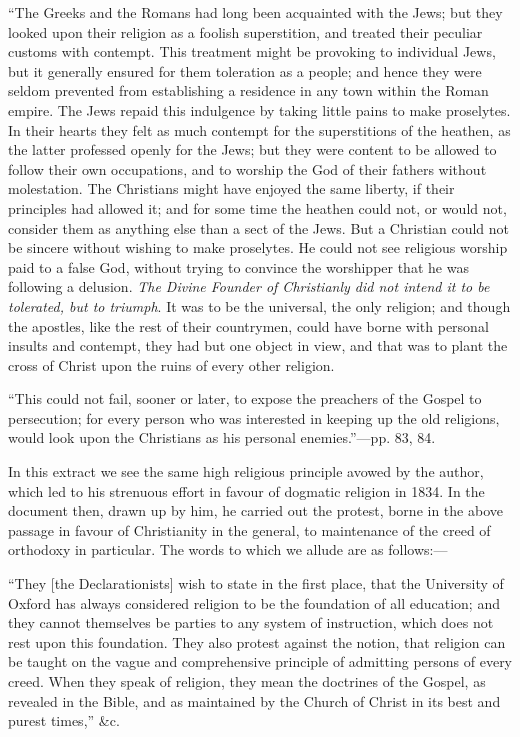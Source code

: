 ``The
Greeks and the Romans had long been acquainted with the Jews; but they
looked upon their religion as a foolish superstition, and treated their
peculiar customs with contempt. This treatment might be provoking to
individual Jews, but it generally ensured for them toleration as a
people; and hence they were seldom prevented from establishing a
residence in any town within the Roman empire. The Jews repaid this
indulgence by taking little pains to make proselytes. In their hearts
they felt as much contempt for the superstitions of the heathen, as the
latter professed openly for the Jews; but they were content to be
allowed to follow their own occupations, and to worship the God of their
fathers without molestation. The Christians might have enjoyed the same
liberty, if their principles had allowed it; and for some time the
heathen could not, or would not, consider them as anything else than a
sect of the Jews. But a Christian could not be sincere without wishing
to make proselytes. He could not see religious worship paid to a false
God, without trying to convince the worshipper that he was following a
delusion. \emph{The Divine Founder of Christianly did not intend it to be
tolerated, but to triumph}. It was to be the universal, the only
religion; and though the apostles, like the rest of their countrymen,
could have borne with personal insults and contempt, they had but one
object in view, and that was to plant the cross of Christ upon the ruins
of every other religion.

``This
could not fail, sooner or later, to expose the preachers of the Gospel
to persecution; for every person who was interested in keeping up the
old religions, would look upon the Christians as his personal
enemies.''—pp. 83, 84.

In this
extract we see the same high religious principle avowed by the author,
which led to his strenuous effort in favour of dogmatic religion in
1834. In the document then, drawn up by him, he carried out the protest,
borne in the above passage in favour of Christianity in the general, to
maintenance of the creed of orthodoxy in particular. The words to
which we allude are as follows:—

``They [the Declarationists] wish to
state in the first place, that the University of Oxford has always
considered religion to be the foundation of all education; and they
cannot themselves be parties to any system of instruction, which does
not rest upon this foundation. They also protest against the notion,
that religion can be taught on the vague and comprehensive principle of
admitting persons of every creed. When they speak of religion, they mean
the doctrines of the Gospel, as revealed in the Bible, and as maintained
by the Church of Christ in its best and purest times,'' \&c.

